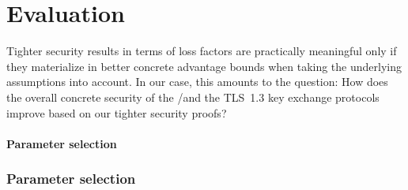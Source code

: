 \section{Evaluation}
\label{sec:evaluation}

Tighter security results in terms of loss factors are practically meaningful only if they materialize in better concrete advantage bounds when taking the underlying assumptions into account.
In our case, this amounts to the question:
How does the overall concrete security of the \SIGMA/\SIGMAI and the TLS~1.3 key exchange protocols improve based on our tighter security proofs?

\iffull
\paragraph{Parameter selection}
\else
\subsubsection*{Parameter selection\lncsdot}
\fi

